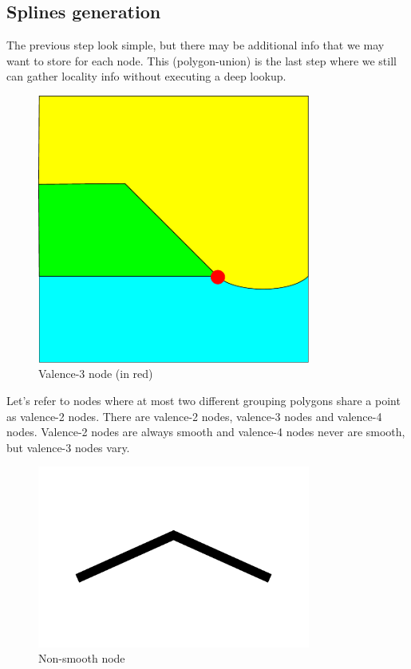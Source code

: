 \subsection{Splines generation}

The previous step look simple, but there may be additional info that we may want to
store for each node. This (polygon-union) is the last step where we still can
gather locality info without executing a deep lookup.

\begin{figure}[H]
  \centering
  \includegraphics[width=0.8\textwidth]{assets/valence-3-node.pdf}
  \caption{Valence-3 node (in red)}
\end{figure}

Let's refer to nodes where at most two different grouping polygons share a point
as valence-2 nodes. There are valence-2 nodes, valence-3 nodes and valence-4
nodes. Valence-2 nodes are always smooth and valence-4 nodes never are smooth,
but valence-3 nodes vary.

\begin{figure}[H]
  \centering
  \includegraphics[width=0.8\textwidth]{assets/non-smooth.pdf}
  \caption{Non-smooth node}
\end{figure}


